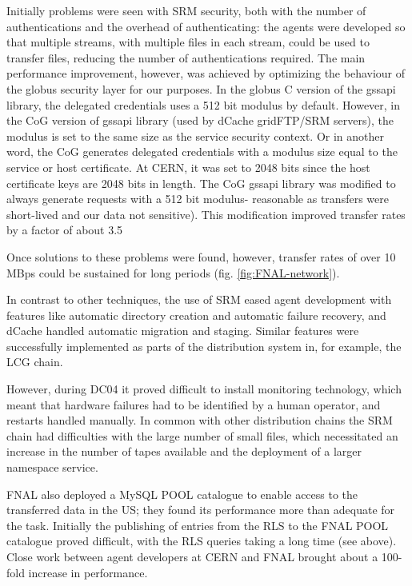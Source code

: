 \documentclass{cmspaper}
\begin{document}
Initially problems were seen with SRM security, both with the number
of authentications and the overhead of authenticating: the agents were
developed so that multiple streams, with multiple files in each
stream, could be used to transfer files, reducing the number of
authentications required. The main performance improvement, however,
was achieved by optimizing the behaviour of the globus security layer
for our purposes. In the globus C version of the gssapi library, the
delegated credentials uses a 512 bit modulus by default. However, in
the CoG version of gssapi library (used by dCache gridFTP/SRM
servers), the modulus is set to the same size as the service security
context. Or in another word, the CoG generates delegated credentials
with a modulus size equal to the service or host certificate.  At
CERN, it was set to 2048 bits since the host certificate keys are 2048
bits in length. The CoG gssapi library was modified to always generate
requests with a 512 bit modulus- reasonable as transfers were
short-lived and our data not sensitive). This modification improved transfer
rates by a factor of about 3.5

Once solutions to these problems were found, however, transfer rates
of over 10 MBps could be sustained for long periods
(fig. \ref{fig:FNAL-network}).

In contrast to other techniques, the use of SRM eased agent
development with features like automatic directory creation and
automatic failure recovery, and dCache handled automatic migration and
staging. Similar features were successfully implemented as parts of
the distribution system in, for example, the LCG chain.

However, during DC04 it proved difficult to install monitoring
technology, which meant that hardware failures had to be identified by
a human operator, and restarts handled manually. In common with other
distribution chains the SRM chain had difficulties with the large
number of small files, which necessitated an increase in the number of
tapes available and the deployment of a larger namespace service.

FNAL also deployed a MySQL POOL catalogue to enable access to the
transferred data in the US; they found its performance more than
adequate for the task. Initially the publishing of entries from the
RLS to the FNAL POOL catalogue proved difficult, with the RLS queries
taking a long time (see above). Close work between agent developers at
CERN and FNAL brought about a 100-fold increase in performance.
\end{document}

